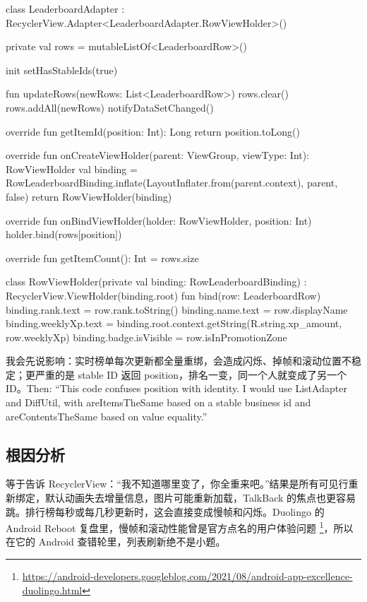 \begin{ktbug}
class LeaderboardAdapter : RecyclerView.Adapter<LeaderboardAdapter.RowViewHolder>() {
    private val rows = mutableListOf<LeaderboardRow>()

    init {
        setHasStableIds(true)
    }

    fun updateRows(newRows: List<LeaderboardRow>) {
        rows.clear()
        rows.addAll(newRows)
        notifyDataSetChanged()
    }

    override fun getItemId(position: Int): Long {
        return position.toLong()
    }

    override fun onCreateViewHolder(parent: ViewGroup, viewType: Int): RowViewHolder {
        val binding = RowLeaderboardBinding.inflate(LayoutInflater.from(parent.context), parent, false)
        return RowViewHolder(binding)
    }

    override fun onBindViewHolder(holder: RowViewHolder, position: Int) {
        holder.bind(rows[position])
    }

    override fun getItemCount(): Int = rows.size

    class RowViewHolder(private val binding: RowLeaderboardBinding) : RecyclerView.ViewHolder(binding.root) {
        fun bind(row: LeaderboardRow) {
            binding.rank.text = row.rank.toString()
            binding.name.text = row.displayName
            binding.weeklyXp.text = binding.root.context.getString(R.string.xp_amount, row.weeklyXp)
            binding.badge.isVisible = row.isInPromotionZone
        }
    }
}
\end{ktbug}

\begin{sayit}[面试里怎么说]
我会先说影响：实时榜单每次更新都全量重绑，会造成闪烁、掉帧和滚动位置不稳定；更严重的是 stable ID 返回 position，排名一变，同一个人就变成了另一个 ID。Then: ``This code confuses position with identity. I would use ListAdapter and DiffUtil, with areItemsTheSame based on a stable business id and areContentsTheSame based on value equality.''
\end{sayit}

\subsection*{根因分析}
 等于告诉 RecyclerView：“我不知道哪里变了，你全重来吧。”结果是所有可见行重新绑定，默认动画失去增量信息，图片可能重新加载，TalkBack 的焦点也更容易跳。排行榜每秒或每几秒更新时，这会直接变成慢帧和闪烁。Duolingo 的 Android Reboot 复盘里，慢帧和滚动性能曾是官方点名的用户体验问题 \srcofficial\footnote{\url{https://android-developers.googleblog.com/2021/08/android-app-excellence-duolingo.html}}，所以在它的 Android 查错轮里，列表刷新绝不是小题。

